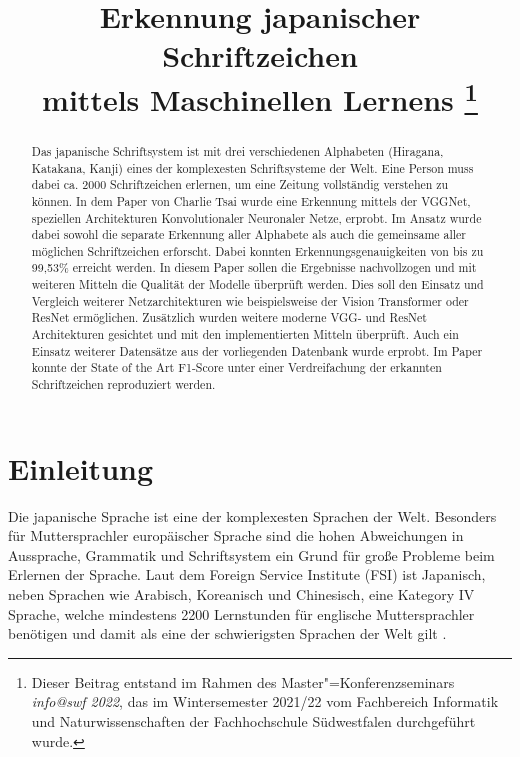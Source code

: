 \documentclass[twoside,a4paper]{IEEEtran}
\begin{document}
\title{Erkennung japanischer Schriftzeichen \\mittels Maschinellen Lernens%
    \thanks{%
    Dieser Beitrag entstand im 
    Rahmen des Master"=Konferenzseminars \emph{info@swf 2022}, das im
    Wintersemester 2021/22 vom Fachbereich Informatik und
    Naturwissenschaften der Fachhochschule Südwestfalen
    durchgeführt wurde.}}
\author{
}

\maketitle


\begin{abstract}
Das japanische Schriftsystem ist mit drei verschiedenen Alphabeten (Hiragana, Katakana, Kanji) eines der komplexesten Schriftsysteme der Welt. Eine Person muss dabei ca. 2000 Schriftzeichen erlernen, um eine Zeitung vollständig verstehen zu können. In dem Paper \cite{RHC} von Charlie Tsai wurde eine Erkennung mittels der VGGNet, speziellen Architekturen Konvolutionaler Neuronaler Netze, erprobt. Im Ansatz wurde dabei sowohl die separate Erkennung aller Alphabete als auch die gemeinsame aller möglichen Schriftzeichen erforscht. Dabei konnten Erkennungsgenauigkeiten von bis zu 99,53\% erreicht werden. In diesem Paper sollen die Ergebnisse nachvollzogen und mit weiteren Mitteln die Qualität der Modelle überprüft werden. Dies soll den Einsatz und Vergleich weiterer Netzarchitekturen wie beispielsweise der Vision Transformer oder ResNet ermöglichen. Zusätzlich wurden weitere moderne VGG- und ResNet Architekturen gesichtet und mit den implementierten Mitteln überprüft. Auch ein Einsatz weiterer Datensätze aus der vorliegenden Datenbank wurde erprobt. Im Paper konnte der State of the Art F1-Score unter einer Verdreifachung der erkannten Schriftzeichen reproduziert werden.
\end{abstract}


\section{Einleitung}
Die japanische Sprache ist eine der komplexesten Sprachen der Welt. Besonders für Muttersprachler europäischer Sprache sind die hohen Abweichungen in Aussprache, Grammatik und Schriftsystem ein Grund für große Probleme beim Erlernen der Sprache. Laut dem Foreign Service Institute (FSI) ist Japanisch, neben Sprachen wie Arabisch, Koreanisch und Chinesisch, eine Kategory IV Sprache, welche mindestens 2200 Lernstunden für englische Muttersprachler benötigen und damit als eine der schwierigsten Sprachen der Welt gilt \cite{FSI}.
\end{document}
